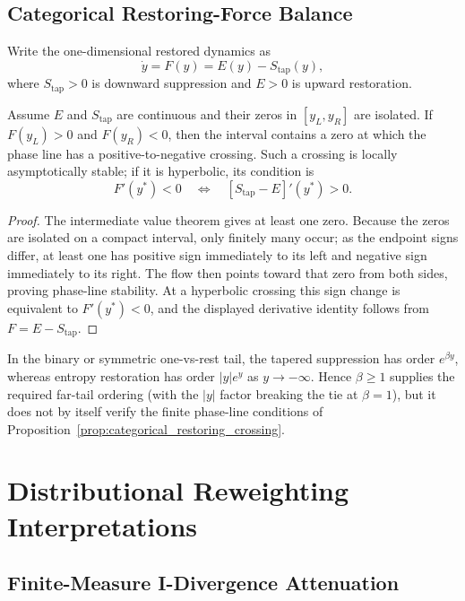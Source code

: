 \documentclass[sigconf,anonymous,review]{acmart}
\theoremstyle{acmdefinition}
\begin{document}
\subsection{Categorical Restoring-Force Balance}
\label{app:categorical_restoring_balance}

Write the one-dimensional restored dynamics as
\[
\dot y=F(y)=E(y)-S_{\mathrm{tap}}(y),
\]
where \(S_{\mathrm{tap}}>0\) is downward suppression and \(E>0\) is
upward restoration.

\begin{proposition}
\label{prop:categorical_restoring_crossing}
Assume \(E\) and \(S_{\mathrm{tap}}\) are continuous and their zeros in
\([y_L,y_R]\) are isolated. If
\(F(y_L)>0\) and \(F(y_R)<0\), then the interval contains a zero at
which the phase line has a positive-to-negative crossing. Such a
crossing is locally asymptotically stable; if it is hyperbolic, its
condition is
\[
F'(y^*)<0
\quad\Longleftrightarrow\quad
[S_{\mathrm{tap}}-E]'(y^*)>0.
\]
\end{proposition}

\begin{proof}
The intermediate value theorem gives at least one zero. Because the
zeros are isolated on a compact interval, only finitely many occur; as
the endpoint signs differ, at least one has positive sign immediately
to its left and negative sign immediately to its right. The flow then
points toward that zero from both sides, proving phase-line stability. At a
hyperbolic crossing this sign change is equivalent to \(F'(y^*)<0\),
and the displayed derivative identity follows from \(F=E-S_{\mathrm{tap}}\).
\end{proof}

In the binary or symmetric one-vs-rest tail, the tapered suppression
has order \(e^{\beta y}\), whereas entropy restoration has order
\(|y|e^y\) as \(y\to-\infty\). Hence \(\beta\ge1\) supplies the
required far-tail ordering (with the \(|y|\) factor breaking the tie at
\(\beta=1\)), but it does not by itself verify the finite phase-line
conditions of Proposition~\ref{prop:categorical_restoring_crossing}.

\section{Distributional Reweighting Interpretations}
\label{app:distributional_reweighting}

\subsection{Finite-Measure I-Divergence Attenuation}
\label{app:finite_measure_variational}
\end{document}
